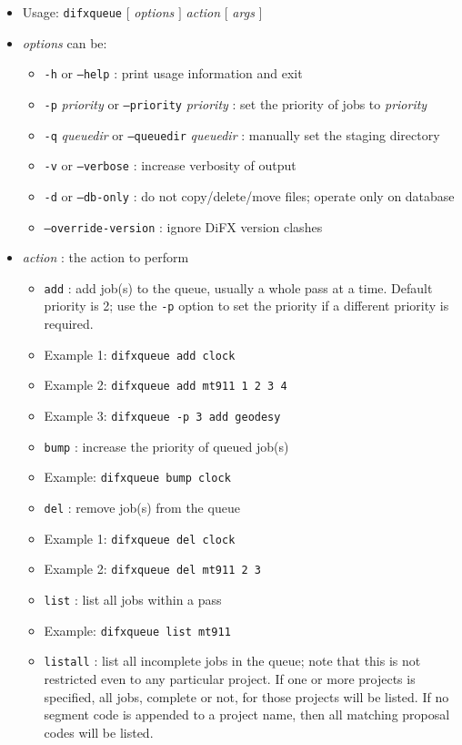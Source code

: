 \begin{itemize}
\item[] Usage: {\tt difxqueue} $[$ {\em options} $]$ {\em action} $[$ {\em args} $]$
\item[] {\em options} can be:
\begin{itemize}
\item[] {\tt -h} or {\tt --help} : print usage information and exit
\item[] {\tt -p} {\em priority} or {\tt --priority} {\em priority} : set the priority of jobs to {\em priority}
\item[] {\tt -q} {\em queuedir} or {\tt --queuedir} {\em queuedir} : manually set the staging directory
\item[] {\tt -v} or {\tt --verbose} : increase verbosity of output
\item[] {\tt -d} or {\tt --db-only} : do not copy/delete/move files; operate only on database
\item[] {\tt --override-version} : ignore DiFX version clashes 
\end{itemize}
\item[] {\em action} : the action to perform
\begin{itemize}
\item[] {\tt add} : add job(s) to the queue, usually a whole pass at a time.  Default priority is 2; use the {\tt -p} option to set the priority if a different priority is required.
\item[] Example 1: {\tt difxqueue add clock}
\item[] Example 2: {\tt difxqueue add mt911 1 2 3 4}
\item[] Example 3: {\tt difxqueue -p 3 add geodesy}
\vspace{5pt}
\item[] {\tt bump} : increase the priority of queued job(s)
\item[] Example: {\tt difxqueue bump clock}
\vspace{5pt}
\item[] {\tt del} : remove job(s) from the queue
\item[] Example 1: {\tt difxqueue del clock}
\item[] Example 2: {\tt difxqueue del mt911 2 3}
\vspace{5pt}
\item[] {\tt list} : list all jobs within a pass
\item[] Example: {\tt difxqueue list mt911}
\vspace{5pt}
\item[] {\tt listall} : list all incomplete jobs in the queue; note that this is not restricted even to any particular project.  If one or more projects is specified, all jobs, complete or not, for those projects will be listed.  If no segment code is appended to a project name, then all matching proposal codes will be listed.

\end{itemize}
\end{itemize}
